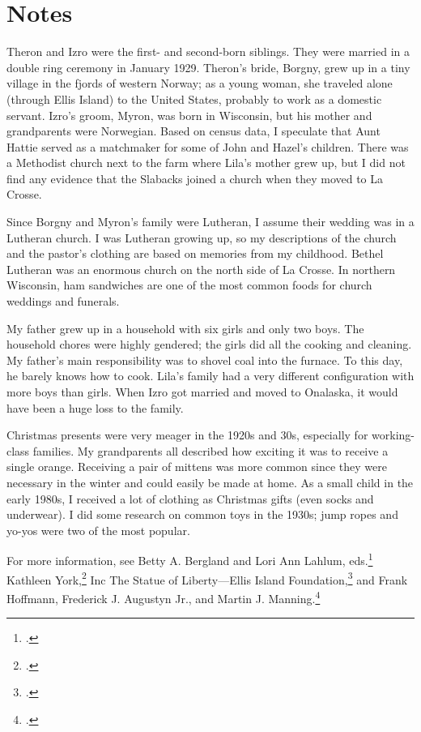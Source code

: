 \documentclass[
  american,
  letterpaper,
]{book}
\begin{document}
\section{Notes}\label{notes-6}

Theron and Izro were the first- and second-born siblings. They were
married in a double ring ceremony in January 1929. Theron's bride,
Borgny, grew up in a tiny village in the fjords of western Norway; as a
young woman, she traveled alone (through Ellis Island) to the United
States, probably to work as a domestic servant. Izro's groom, Myron, was
born in Wisconsin, but his mother and grandparents were Norwegian. Based
on census data, I speculate that Aunt Hattie served as a matchmaker for
some of John and Hazel's children. There was a Methodist church next to
the farm where Lila's mother grew up, but I did not find any evidence
that the Slabacks joined a church when they moved to La Crosse.

Since Borgny and Myron's family were Lutheran, I assume their wedding
was in a Lutheran church. I was Lutheran growing up, so my descriptions
of the church and the pastor's clothing are based on memories from my
childhood. Bethel Lutheran was an enormous church on the north side of
La Crosse. In northern Wisconsin, ham sandwiches are one of the most
common foods for church weddings and funerals.

My father grew up in a household with six girls and only two boys. The
household chores were highly gendered; the girls did all the cooking and
cleaning. My father's main responsibility was to shovel coal into the
furnace. To this day, he barely knows how to cook. Lila's family had a
very different configuration with more boys than girls. When Izro got
married and moved to Onalaska, it would have been a huge loss to the
family.

Christmas presents were very meager in the 1920s and 30s, especially for
working-class families. My grandparents all described how exciting it
was to receive a single orange. Receiving a pair of mittens was more
common since they were necessary in the winter and could easily be made
at home. As a small child in the early 1980s, I received a lot of
clothing as Christmas gifts (even socks and underwear). I did some
research on common toys in the 1930s; jump ropes and yo-yos were two of
the most popular.

For more information, see Betty A. Bergland and Lori Ann Lahlum,
eds.\footnote{.} Kathleen York,\footnote{.} Inc The Statue of Liberty---Ellis Island
Foundation,\footnote{.} and Frank
Hoffmann, Frederick J. Augustyn Jr., and Martin J. Manning.\footnote{.}
\end{document}
